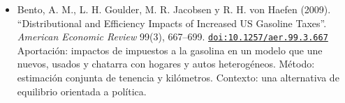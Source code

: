 \documentclass[11pt]{article}
\begin{document}
\begin{itemize}
Aportación: versión con uso del vehículo y tipo de auto. Método: modelo dinámico de tenencia, tipo y uso. Contexto: sirve para ver lo que quedó fuera de la versión de 2022.
\item Bento, A. M., L. H. Goulder, M. R. Jacobsen y R. H. von Haefen (2009). ``Distributional and Efficiency Impacts of Increased US Gasoline Taxes''. \textit{American Economic Review} 99(3), 667--699. \href{https://doi.org/10.1257/aer.99.3.667}{\texttt{doi:10.1257/aer.99.3.667}}\\
Aportación: impactos de impuestos a la gasolina en un modelo que une nuevos, usados y chatarra con hogares y autos heterogéneos. Método: estimación conjunta de tenencia y kilómetros. Contexto: una alternativa de equilibrio orientada a política.
\end{itemize}
\end{document}
